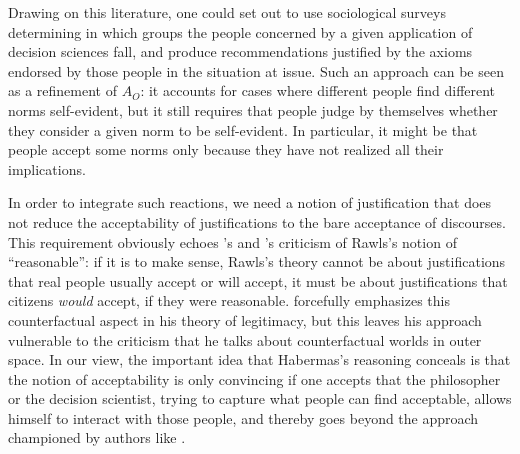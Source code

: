 \documentclass[preprint, french, english, 11pt, authoryear]{elsarticle}%
\begin{document}
Drawing on this literature, one could set out to use sociological surveys determining in which groups the people concerned by a given application of decision sciences fall, and produce recommendations justified by the axioms endorsed by those people in the situation at issue. Such an approach can be seen as a refinement of $A_O$: it accounts for cases where different people find different norms self-evident, but it still requires that people judge by themselves whether they consider a given norm to be self-evident. In particular, it might be that people accept some norms only because they have not realized all their implications.

In order to integrate such reactions, we need a notion of justification that does not reduce the acceptability of justifications to the bare acceptance of discourses. 
This requirement obviously echoes \citeauthor{habermas_reconciliation_1995}’s and \citeauthor{estlund_democratic_2009}’s criticism of Rawls's notion of “reasonable”: if it is to make sense, Rawls's theory cannot be about justifications that real people usually accept or will accept, it must be about justifications that citizens \emph{would} accept, if they were reasonable. \citet{habermas_faktizitat_1992} forcefully emphasizes this counterfactual aspect in his theory of legitimacy, but this leaves his approach vulnerable to the criticism that he talks about counterfactual worlds in outer space. 
In our view, the important idea that Habermas's reasoning conceals is that the notion of acceptability is only convincing if one accepts that the philosopher or the decision scientist, trying to capture what people can find acceptable, allows himself to interact with those people, and thereby goes beyond the approach championed by authors like \cite{boltanski_justification_2006}.
\end{document}
